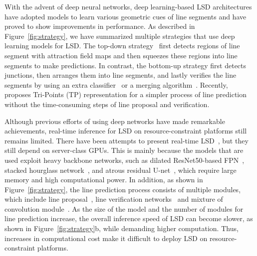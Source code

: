 \documentclass[letterpaper]{article} \usepackage{aaai22}  \usepackage{times}  \usepackage{helvet}  \usepackage{courier}  \usepackage[hyphens]{url}  \usepackage{graphicx} \urlstyle{rm} \def\UrlFont{\rm}  \usepackage{natbib}  \usepackage{caption} \DeclareCaptionStyle{ruled}{labelfont=normalfont,labelsep=colon,strut=off} \frenchspacing  \setlength{\pdfpagewidth}{8.5in}  \setlength{\pdfpageheight}{11in}  \usepackage{algorithm}
\begin{document}
With the advent of deep neural networks, deep learning-based LSD architectures have adopted models to learn various geometric cues of line segments and have proved to show improvements in performance.
As described in Figure~\ref{fig:strategy}, we have summarized multiple strategies that use deep learning models for LSD.
The top-down strategy~\cite{xue2019learning} first detects regions of line segment with attraction field maps and then squeezes these regions into line segments to make predictions.
In contrast, the bottom-up strategy first detects junctions, then arranges them into line segments, and lastly verifies the line segments by using an extra classifier~\cite{zhou2019end,xue2020holistically,zhang2019ppgnet} or a merging algorithm~\cite{huang2019wireframe,huang2018learning}.
Recently, \cite{huang2020tp} proposes Tri-Points (TP) representation for a simpler process of line prediction without the time-consuming steps of line proposal and verification.

Although previous efforts of using deep networks have made remarkable achievements, real-time inference for LSD on resource-constraint platforms still remains limited.
There have been attempts to present real-time LSD~\cite{huang2020tp,meng2020lgnn,xue2020holistically}, but they still depend on server-class GPUs.
This is mainly because the models that are used exploit heavy backbone networks, such as dilated ResNet50-based FPN~\cite{zhang2019ppgnet}, stacked hourglass network~\cite{meng2020lgnn,huang2020tp}, and atrous residual U-net~\cite{xue2019learning}, which require large memory and high computational power.
In addition, as shown in Figure~\ref{fig:strategy}, the line prediction process consists of multiple modules, which include line proposal~\cite{xue2019learning,zhang2019ppgnet,zhou2019end,xue2020holistically}, line verification networks~\cite{zhang2019ppgnet,zhou2019end,xue2020holistically} and mixture of convolution module~\cite{huang2020tp,huang2018learning}.
As the size of the model and the number of modules for line prediction increase, the overall inference speed of LSD can become slower, as shown in Figure~\ref{fig:strategy}b, while demanding higher computation.
Thus, increases in computational cost make it difficult to deploy LSD on resource-constraint platforms.
\end{document}
